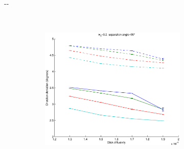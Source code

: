 \documentclass{article}
\begin{document}
\begin{figure}[H]
\begin{adjustwidth}{-\oddsidemargin}{-\rightmargin}
\begin{subfigure}{0.8\paperwidth}
\begin{subfigure}{0.3\textwidth}
      \end{subfigure}
      ~
      \begin{subfigure}{0.3\textwidth}
        \centering
        \includegraphics[width=\textwidth]{figures/synth_bas_weights_diffus__snr=20__w1=2__angle=90.eps}
      \end{subfigure}
  \end{subfigure}


\end{adjustwidth}
\end{figure}
\end{document}
